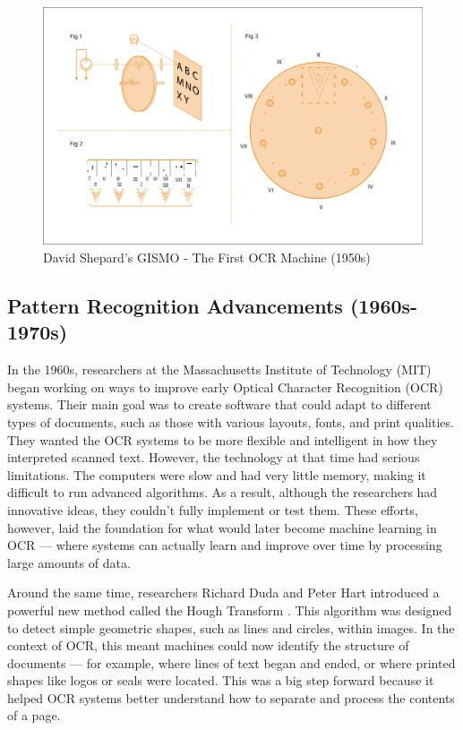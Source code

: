 \begin{figure}[ht]
    \centering
    \includegraphics[width=1\textwidth]{figures/David_Shepard_ocr.png}
    \caption{David Shepard's GISMO - The First OCR Machine (1950s) \cite{docsumo2023ocr}}
    \label{fig:shepard-ocr}
\end{figure}

\subsection{Pattern Recognition Advancements (1960s-1970s)}
\label{sec:pattern-recognition}

In the 1960s, researchers at the Massachusetts Institute of Technology (MIT)  
began working on ways to improve early Optical Character Recognition (OCR) systems. 
Their main goal was to create software that could adapt to different types of documents, 
such as those with various layouts, fonts, and print qualities. They wanted the OCR systems 
to be more flexible and intelligent in how they interpreted scanned text. However, 
the technology at that time had serious limitations. The computers were slow and had 
very little memory, making it difficult to run advanced algorithms. As a result, although 
the researchers had innovative ideas, they couldn't fully implement or test them. These 
efforts, however, laid the foundation for what would later become machine learning in 
OCR — where systems can actually learn and improve over time by processing large amounts of data.

Around the same time, researchers Richard Duda and Peter Hart introduced a powerful new method 
called the Hough Transform \cite{duda1972use}. This algorithm was designed to detect simple 
geometric shapes, such as lines and circles, within images. In the context of OCR, 
this meant machines could now identify the structure of documents — for example, 
where lines of text began and ended, or where printed shapes like logos or seals were located. 
This was a big step forward because it helped OCR systems better understand how to separate 
and process the contents of a page.


